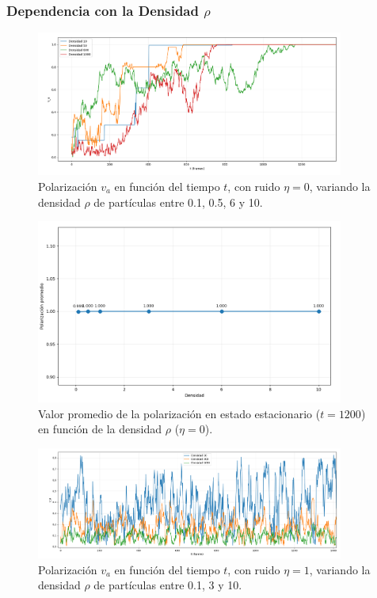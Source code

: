 \documentclass{article}
\begin{document}
\subsubsection{Dependencia con la Densidad $\rho$}

\begin{figure}[H]
\centering
\includegraphics[width=0.9\textwidth]{Voter Ruido 0 variando densidad.png}
\caption{Polarización $v_a$ en función del tiempo $t$, con ruido $\eta = 0$, variando la densidad $\rho$ de partículas entre 0.1, 0.5, 6 y 10.}
\label{fig:promedio_va_densidad_voter0}
\end{figure}

\begin{figure}[H]
\centering
\includegraphics[width=0.9\textwidth]{Voter Ruido 0 variando densidad avg.png}
\caption{Valor promedio de la polarización en estado estacionario ($t  = 1200$) en función de la densidad $\rho$ ($\eta = 0$).}
\label{fig:va_tiempo_densidad_voter0}
\end{figure}

\begin{figure}[H]
\centering
\includegraphics[width=0.9\textwidth]{Voter Ruido 1 variando densidad.png}
\caption{Polarización $v_a$ en función del tiempo $t$, con ruido $\eta = 1$, variando la densidad $\rho$ de partículas entre 0.1, 3 y 10.}
\label{fig:promedio_va_densidad_voter1}
\end{figure}
\end{document}
